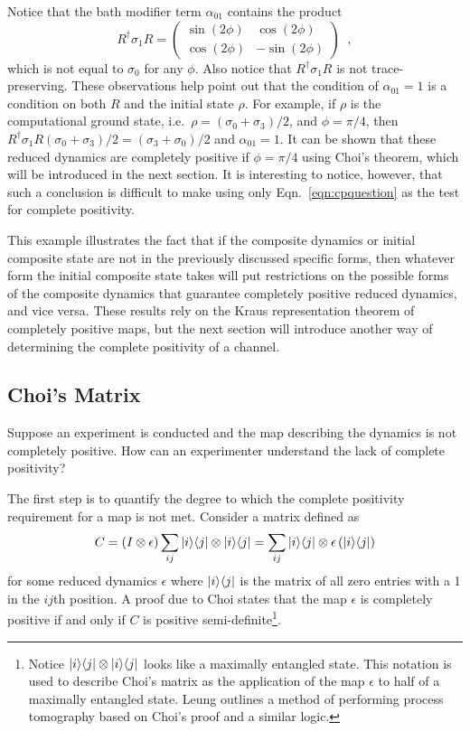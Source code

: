 \begin{example}
Notice that the bath modifier term $\alpha_{01}$ contains the product
$$
R^\dagger\sigma_1R = \begin{pmatrix}
\sin{\left(2\phi\right)}&\cos{\left(2\phi\right)}\\
\cos{\left(2\phi\right)}&-\sin{\left(2\phi\right)}
\end{pmatrix}\;\;,
$$
which is not equal to $\sigma_0$ for any $\phi$.  Also notice that $R^\dagger\sigma_1R$ is not trace-preserving.  These observations help point out that the condition of $\alpha_{01} = 1$ is a condition on both $R$ and the initial state $\rho$.  For example, if $\rho$ is the computational ground state, i.e.\ $\rho = (\sigma_0+\sigma_3)/2$, and $\phi=\pi/4$, then $R^\dagger\sigma_1R(\sigma_0+\sigma_3)/2 = (\sigma_3+\sigma_0)/2$ and $\alpha_{01}=1$.  It can be shown that these reduced dynamics are completely positive if $\phi=\pi/4$ using Choi's theorem, which will be introduced in the next section.  It is interesting to notice, however, that such a conclusion is difficult to make using only Eqn.\ \ref{eqn:cpquestion} as the test for complete positivity.
\end{example}

This example illustrates the fact that if the composite dynamics or initial composite state are not in the previously discussed specific forms, then whatever form the initial composite state takes will put restrictions on the possible forms of the composite dynamics that guarantee completely positive reduced dynamics, and vice versa.  These results rely on the Kraus representation theorem of completely positive maps, but the next section will introduce another way of determining the complete positivity of a channel.

\subsection{Choi's Matrix}
\label{sec:choi}

Suppose an experiment is conducted and the map describing the dynamics is not completely positive.  How can an experimenter understand the lack of complete positivity?

The first step is to quantify the degree to which the complete positivity requirement for a map is not met.  Consider a matrix defined as
$$
C = \left(I \otimes \epsilon\right)\sum_{ij} |i\rangle\langle j| \otimes |i\rangle\langle j| = \sum_{ij} |i\rangle\langle j| \otimes \epsilon\left( |i\rangle\langle j| \right)
$$
for some reduced dynamics $\epsilon$ where $|i\rangle\langle j|$ is the matrix of all zero entries with a 1 in the $ij$th position.  A proof due to Choi \cite{Choi1975} states that the map $\epsilon$ is completely positive if and only if $C$ is positive semi-definite\footnote{Notice $|i\rangle\langle j|\otimes |i\rangle\langle j|$ looks like a maximally entangled state.  This notation is used to describe Choi's matrix as the application of the map $\epsilon$ to half of a maximally entangled state.  Leung \cite{Leung2003} outlines a method of performing process tomography based on Choi's proof and a similar logic.}.  

